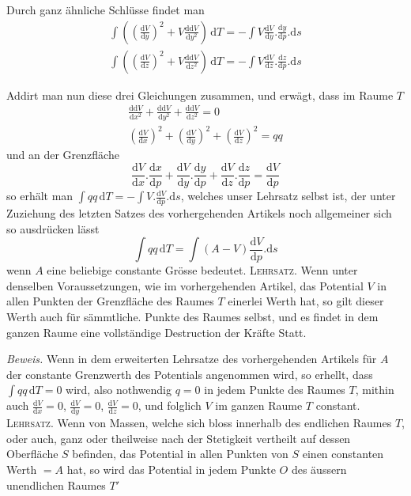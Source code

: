 Durch ganz ähnliche Schlüsse findet man
\[
\begin{gathered}
\int((\frac{\mathrm dV}{\mathrm dy})^2+V\frac{\mathrm d\mathrm dV}{\mathrm dy^2})\,\mathrm dT=-\int V\frac{\mathrm dV}{\mathrm dy}.\frac{\mathrm dy}{\mathrm dp}.\mathrm ds\\
\int((\frac{\mathrm dV}{\mathrm dz})^2+V\frac{\mathrm d\mathrm dV}{\mathrm dz^2})\,\mathrm dT=-\int V\frac{\mathrm dV}{\mathrm dz}.\frac{\mathrm dz}{\mathrm dp}.\mathrm ds
\end{gathered}
\]

Addirt man nun diese drei Gleichungen zusammen, und erwägt, dass im Raume $T$
\[
\begin{gathered}
\frac{\mathrm d\mathrm dV}{\mathrm dx^2}+\frac{\mathrm d\mathrm dV}{\mathrm dy^2}+\frac{\mathrm d\mathrm dV}{\mathrm dz^2}=0\\
(\frac{\mathrm dV}{\mathrm dx})^2+(\frac{\mathrm dV}{\mathrm dy})^2+(\frac{\mathrm dV}{\mathrm dz})^2=qq
\end{gathered}
\]
und an der Grenzfläche
\[
\frac{\mathrm dV}{\mathrm dx}.\frac{\mathrm dx}{\mathrm dp}+\frac{\mathrm dV}{\mathrm dy}.\frac{\mathrm dy}{\mathrm dp}+\frac{\mathrm dV}{\mathrm dz}.\frac{\mathrm dz}{\mathrm dp}=\frac{\mathrm dV}{\mathrm dp}
\]
so erhält man $\int qq\,\mathrm dT=-\int V.\frac{\mathrm dV}{\mathrm dp}.\mathrm ds$, welches unser Lehrsatz selbst ist, der unter Zuziehung des letzten Satzes des vorhergehenden Artikels noch allgemeiner sich so ausdrücken lässt
\[
\int qq\,\mathrm dT=\int(A-V)\frac{\mathrm dV}{\mathrm dp}.\mathrm ds
\]
wenn $A$ eine beliebige constante Grösse bedeutet.
\textsc{Lehrsatz.} Wenn unter denselben Voraussetzungen, wie im vorhergehenden Artikel, das Potential $V$ in allen Punkten der Grenzfläche des Raumes $T$ einerlei Werth hat, so gilt dieser Werth auch für sämmtliche. Punkte des Raumes selbst, und es findet in dem ganzen Raume eine vollständige Destruction der Kräfte Statt.

\textit{Beweis.} Wenn in dem erweiterten Lehrsatze des vorhergehenden Artikels für $A$ der constante Grenzwerth des Potentials angenommen wird, so erhellt, dass $\int qq\,\mathrm dT=0$ wird, also nothwendig $q=0$ in jedem Punkte des Raumes $T$, mithin auch $\frac{\mathrm dV}{\mathrm dx}=0$, $\frac{\mathrm dV}{\mathrm dy}=0$, $\frac{\mathrm dV}{\mathrm dz}=0$, und folglich $V$ im ganzen Raume $T$ constant.
\textsc{Lehrsatz.} Wenn von Massen, welche sich bloss innerhalb des endlichen Raumes $T$, oder auch, ganz oder theilweise nach der Stetigkeit vertheilt auf dessen Oberfläche $S$ befinden, das Potential in allen Punkten von $S$ einen constanten Werth $=A$ hat, so wird das Potential in jedem Punkte $O$ des äussern unendlichen Raumes $T'$


